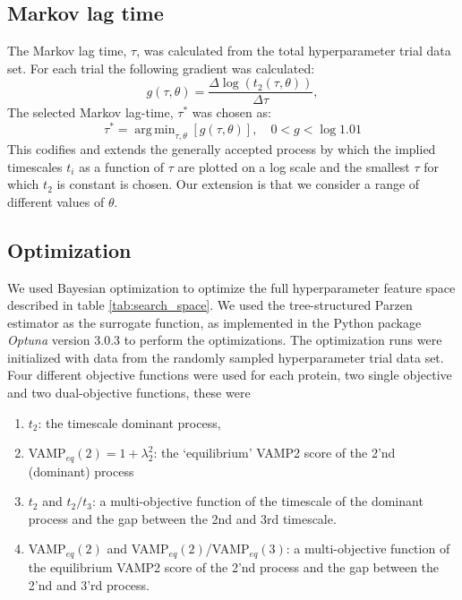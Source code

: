 \documentclass[journal=jacsat,manuscript=article]{achemso}
\DeclareMathOperator*{\argmin}{arg\,min}
\begin{document}
\subsection{Markov lag time}
The Markov lag time, $\tau$, was calculated from the total hyperparameter trial data set. For each trial the following gradient was calculated:
\begin{equation}
    g(\tau, \theta) = \frac{\Delta \log{\left(t_{2}(\tau, \theta)\right)}}{\Delta \tau}, 
\end{equation}\label{eqn:choose_lag_1}
The selected Markov lag-time, $\tau^{*}$ was chosen as:
\begin{equation}
    \tau^{*}  = \argmin_{\tau, \theta}\left[g(\tau, \theta)\right], \quad 0 < g < \log{1.01}
\end{equation}\label{eqn:choose_lag_2}
This codifies and extends the generally accepted process by which the implied timescales $t_{i}$ as a function of $\tau$ are plotted on a log scale and the smallest $\tau$ for which $t_{2}$ is constant is chosen. Our extension is that we consider a range of different values of $\theta$. 


\subsection{Optimization}

We used Bayesian optimization to optimize the full hyperparameter feature space described in table \ref{tab:search_space}. We used the tree-structured Parzen estimator as the surrogate function, as implemented in the Python package \textit{Optuna} version 3.0.3 \cite{akiba_optuna_2019} to perform the optimizations. The optimization runs were initialized with data from the randomly sampled hyperparameter trial data set. Four different objective functions were used for each protein, two single objective and two dual-objective functions, these were 
\begin{enumerate}
    \item $t_2$: the timescale dominant process, 
    \item VAMP$_{eq}(2) = 1+\lambda_{2}^{2}$: the `equilibrium' VAMP2 score of the 2'nd (dominant) process
    \item $t_2$ and $t_{2}/t_{3}$: a multi-objective function of the timescale of the dominant process and the gap between the 2nd and 3rd timescale. 
    \item VAMP$_{eq}(2)$ and VAMP$_{eq}(2)$/VAMP$_{eq}(3)$: a multi-objective function of the equilibrium VAMP2 score of the 2'nd process and the gap between the 2'nd and 3'rd process. 
\end{enumerate}
\end{document}
